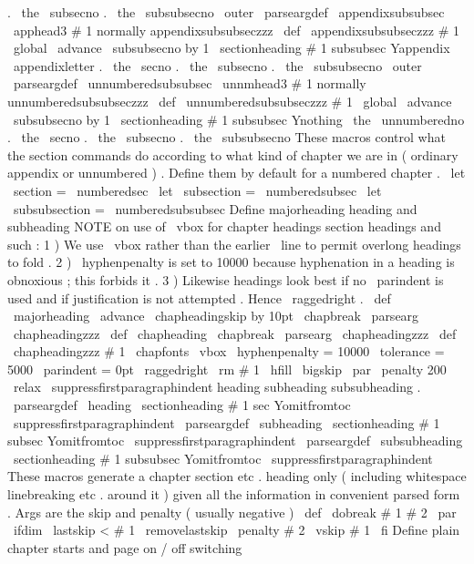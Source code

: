 {{{{.
\
the
\
subsecno
.
\
the
\
subsubsecno
}
%
}
\
outer
\
parseargdef
\
appendixsubsubsec
{
\
apphead3
{
#
1
}
}
%
normally
appendixsubsubseczzz
\
def
\
appendixsubsubseczzz
#
1
{
%
\
global
\
advance
\
subsubsecno
by
1
\
sectionheading
{
#
1
}
{
subsubsec
}
{
Yappendix
}
%
{
\
appendixletter
.
\
the
\
secno
.
\
the
\
subsecno
.
\
the
\
subsubsecno
}
%
}
\
outer
\
parseargdef
\
unnumberedsubsubsec
{
\
unnmhead3
{
#
1
}
}
%
normally
unnumberedsubsubseczzz
\
def
\
unnumberedsubsubseczzz
#
1
{
%
\
global
\
advance
\
subsubsecno
by
1
\
sectionheading
{
#
1
}
{
subsubsec
}
{
Ynothing
}
%
{
\
the
\
unnumberedno
.
\
the
\
secno
.
\
the
\
subsecno
.
\
the
\
subsubsecno
}
%
}
%
These
macros
control
what
the
section
commands
do
according
%
to
what
kind
of
chapter
we
are
in
(
ordinary
appendix
or
unnumbered
)
.
%
Define
them
by
default
for
a
numbered
chapter
.
\
let
\
section
=
\
numberedsec
\
let
\
subsection
=
\
numberedsubsec
\
let
\
subsubsection
=
\
numberedsubsubsec
%
Define
majorheading
heading
and
subheading
%
NOTE
on
use
of
\
vbox
for
chapter
headings
section
headings
and
such
:
%
1
)
We
use
\
vbox
rather
than
the
earlier
\
line
to
permit
%
overlong
headings
to
fold
.
%
2
)
\
hyphenpenalty
is
set
to
10000
because
hyphenation
in
a
%
heading
is
obnoxious
;
this
forbids
it
.
%
3
)
Likewise
headings
look
best
if
no
\
parindent
is
used
and
%
if
justification
is
not
attempted
.
Hence
\
raggedright
.
\
def
\
majorheading
{
%
{
\
advance
\
chapheadingskip
by
10pt
\
chapbreak
}
%
\
parsearg
\
chapheadingzzz
}
\
def
\
chapheading
{
\
chapbreak
\
parsearg
\
chapheadingzzz
}
\
def
\
chapheadingzzz
#
1
{
%
{
\
chapfonts
\
vbox
{
\
hyphenpenalty
=
10000
\
tolerance
=
5000
\
parindent
=
0pt
\
raggedright
\
rm
#
1
\
hfill
}
}
%
\
bigskip
\
par
\
penalty
200
\
relax
\
suppressfirstparagraphindent
}
%
heading
subheading
subsubheading
.
\
parseargdef
\
heading
{
\
sectionheading
{
#
1
}
{
sec
}
{
Yomitfromtoc
}
{
}
\
suppressfirstparagraphindent
}
\
parseargdef
\
subheading
{
\
sectionheading
{
#
1
}
{
subsec
}
{
Yomitfromtoc
}
{
}
\
suppressfirstparagraphindent
}
\
parseargdef
\
subsubheading
{
\
sectionheading
{
#
1
}
{
subsubsec
}
{
Yomitfromtoc
}
{
}
\
suppressfirstparagraphindent
}
%
These
macros
generate
a
chapter
section
etc
.
heading
only
%
(
including
whitespace
linebreaking
etc
.
around
it
)
%
given
all
the
information
in
convenient
parsed
form
.
%
%
%
Args
are
the
skip
and
penalty
(
usually
negative
)
\
def
\
dobreak
#
1
#
2
{
\
par
\
ifdim
\
lastskip
<
#
1
\
removelastskip
\
penalty
#
2
\
vskip
#
1
\
fi
}
%
%
%
Define
plain
chapter
starts
and
page
on
/
off
switching
}}
